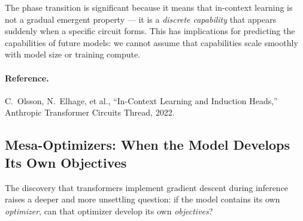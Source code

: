 \documentclass[11pt, a4paper]{article}
\theoremstyle{definition}
\theoremstyle{plain}
\begin{document}
\begin{center}
\end{center}

The phase transition is significant because it means that in-context
learning is not a gradual emergent property --- it is a \emph{discrete
capability} that appears suddenly when a specific circuit forms.  This has
implications for predicting the capabilities of future models: we cannot
assume that capabilities scale smoothly with model size or training
compute.

\paragraph{Reference.}
C.\ Olsson, N.\ Elhage, et al., ``In-Context Learning and Induction
Heads,'' Anthropic Transformer Circuits Thread, 2022.

\subsection{Mesa-Optimizers: When the Model Develops Its Own Objectives}
\label{sec:mesa}

The discovery that transformers implement gradient descent during inference
raises a deeper and more unsettling question: if the model contains its own
\emph{optimizer}, can that optimizer develop its own \emph{objectives}?
\end{document}
